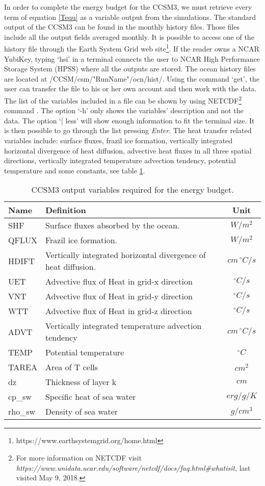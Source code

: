 In order to complete the energy budget for the CCSM3, we must retrieve every term of equation \ref{Tequ} as a variable output from the simulations. The standard output of the CCSM3 can be found in the monthly history files. Those files include all the output fields averaged monthly. It is possible to access one of the history file through the Earth System Grid web site\footnote{https://www.earthsystemgrid.org/home.html}. If the reader owns a NCAR YubiKey, typing `hsi' in a terminal connects the user to NCAR High Performance Storage System (HPSS) where all the outputs are stored. The ocean history files are located at /CCSM/csm/"RunName"/ocn/hist/. Using the command `get', the user can transfer the file to his or her own account and then work with the data. The list of the variables included in a file can be shown by using NETCDF\footnote{For more information on NETCDF visit \textit{https://www.unidata.ucar.edu/software/netcdf/docs/faq.html\#whatisit}, last visited May 9, 2018.} command . The option `-h' only shows the variables' description and not the data. The option `| less' will show enough information to fit the terminal size. It is then possible to go through the list pressing \textit{Enter}. The heat transfer related variables include: surface fluxes, frazil ice formation, vertically integrated horizontal divergence of heat diffusion, advective heat fluxes in all three spatial directions, vertically integrated temperature advection tendency, potential temperature and some constants, see table \ref{var3}.
\begin{table}
\centering
\begin{tabular}{l | l | c}
\hline
 Name  & Definition & Unit \\
\hline
  SHF  & 	Surface fluxes absorbed by the ocean. 	& $W/m^2$  \\
  QFLUX  &    Frazil ice formation.				& $W/m^2$  \\
  HDIFT  &    Vertically integrated horizontal divergence of heat diffusion.	& $cm \, ^\circ C/s$\\
  UET & 	Advective flux of Heat in grid-x direction	&	$^\circ C/s$	\\
  VNT& 	Advective flux of Heat in grid-y direction	&	$^\circ C/s$	\\
  WTT & 	Advective flux of Heat in grid-z direction	&	$^\circ C/s$	\\
  ADVT & 	Vertically integrated temperature advection tendency & $cm \, ^\circ C/s$ \\
  TEMP   & Potential temperature &   $^\circ C$ \\ 
  TAREA & Area of T cells & $cm^2$ \\
  dz & Thickness of layer k & $cm$ \\
  cp\_sw & Specific heat of sea water & $erg/g/K$\\
  rho\_sw & Density of sea water & $g/cm^3$
\end{tabular}
\caption{CCSM3 output variables required for the energy budget.} \label{var3}
\end{table}

